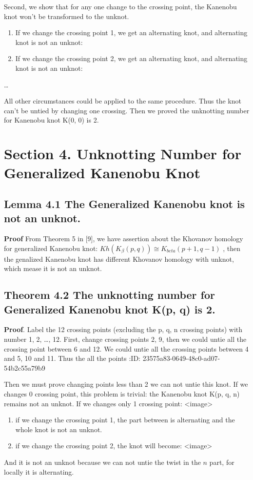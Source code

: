 \documentclass[lang=cn]{elegantpaper}
\begin{document}
Second, we show that for any one change to the crossing point, the Kanenobu knot won't be transformed to the unknot.
\begin{enumerate}
\item If we change the crossing point 1, we get an alternating knot, and alternating knot is not an unknot:

\item If we change the crossing point 2, we get an alternating knot, and alternating knot is not an unknot:
\end{enumerate}
\ldots{}

All other circumstances could be applied to the same procedure. Thus the knot can't be untied by changing one crossing. Then we proved the unknotting number for Kanenobu knot K(0, 0) is 2.
\section{Section 4. Unknotting Number for Generalized Kanenobu Knot}
\label{sec:org6349c9d}
\subsection{Lemma 4.1 The Generalized Kanenobu knot is not an unknot.}
\label{sec:org2edf65b}
\textbf{Proof} From Theorem 5 in [9], we have assertion about the Khovanov homology for generalized Kanenobu knot:
\(Kh(K_{\beta}(p,q)) \cong K_{beta}(p+1, q-1)\) ,
then the genalized Kanenobu knot has different Khovanov homology with unknot, which mease it is not an unknot.
\subsection{Theorem 4.2 The unknotting number for Generalized Kanenobu knot K(p, q) is 2.}
\label{sec:org7402e51}
\textbf{Proof}.
Label the 12 crossing points (excluding the p, q, n crossing points) with number 1, 2, \ldots{}, 12.
First, change crossing points 2, 9, then  we could untie all the crossing point between 6 and 12.
We could untie all the crossing points between 4 and 5, 10 and 11. Thus the all the points
:ID:       23575a83-0649-48c0-ad07-54b2c55a79b9

Then we must prove changing points less than 2 we can not untie this knot.
If we changes 0 crossing point, this problem is trivial: the Kanenobu knot K(p, q, n) remains not an unknot.
If we changes only 1 crossing point:
<image>
\begin{enumerate}
\item if we change the crossing point 1, the part between is alternating and the whole knot is not an unknot.
\item if we change the crossing point 2, the knot will become:
<image>
\end{enumerate}
And it is not an unknot because we can not untie the twist in the \(n\) part, for locally it is alternating.
\end{document}
